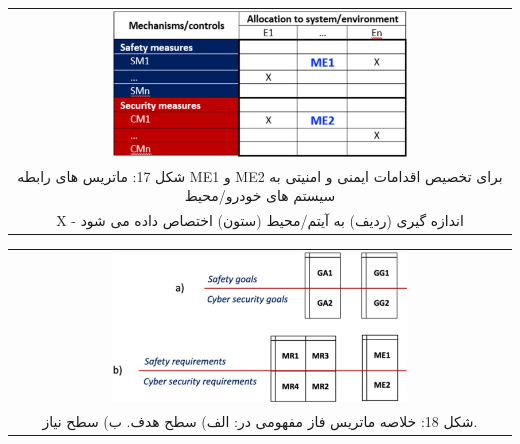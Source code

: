 \documentclass[a4paper,10pt]{article}
\begin{document}
                \begin{table}
            
                    \centering
                    \begin{tabular}{ c }
                        
                        \includegraphics[width=0.6\textwidth]{Image/fig17.jpg} \\
        
                        شکل 17: ماتریس های رابطه ME1 و ME2 برای تخصیص اقدامات ایمنی و امنیتی به سیستم های خودرو/محیط\\
                        X - اندازه گیری (ردیف) به آیتم/محیط (ستون) اختصاص داده می شود

                    \end{tabular}
        
                \end{table}

                \begin{table}
            
                    \centering
                    \begin{tabular}{ c }
                        
                        \includegraphics[width=0.6\textwidth]{Image/fig18.jpg} \\
        
                        شکل 18: خلاصه ماتریس فاز مفهومی در: الف) سطح هدف. ب) سطح نیاز.

                    \end{tabular}
        
                \end{table}
\end{document}
